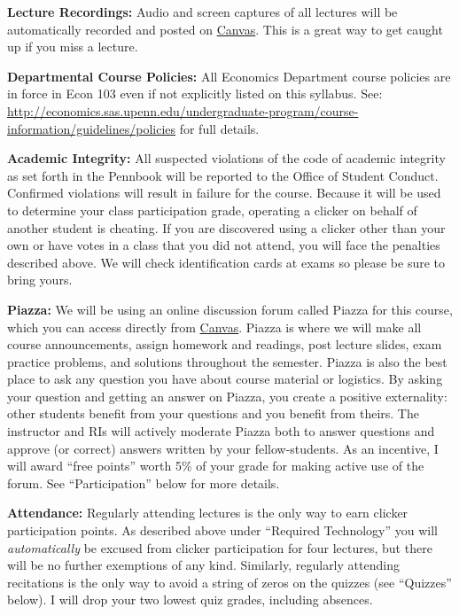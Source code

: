 \documentclass[11pt, letterpaper]{article}
\begin{document}
\bigskip

\noindent \textbf{Lecture Recordings: } Audio and screen captures of all lectures will be automatically recorded and posted on \href{http://upenn.instructure.com}{Canvas}. This is a great way to get caught up if you miss a lecture.

\bigskip

\noindent \textbf{Departmental Course Policies: } All Economics Department course policies are in force in Econ 103 even if not explicitly listed on this syllabus. See: \url{http://economics.sas.upenn.edu/undergraduate-program/course-information/guidelines/policies} for full details. 


\bigskip


\noindent \textbf{Academic Integrity: } All suspected violations of the code of academic integrity as set forth in the Pennbook will be reported to the Office of Student Conduct. Confirmed violations will result in failure for the course. Because it will be used to determine your class participation grade, operating a clicker on behalf of another student is cheating. If you are discovered using a clicker other than your own or have votes in a class that you did not attend, you will face the penalties described above. We will check identification cards at exams so please be sure to bring yours.

\bigskip

\noindent \textbf{Piazza:} We will be using an online discussion forum called Piazza for this course, which you can access directly from \href{http://upenn.instructure.com}{Canvas}. Piazza is where we will make all course announcements, assign homework and readings, post lecture slides, exam practice problems, and solutions throughout the semester. Piazza is also the best place to ask any question you have about course material or logistics. By asking your question and getting an answer on Piazza, you create a positive externality: other students benefit from your questions and you benefit from theirs. The instructor and RIs will actively moderate Piazza both to answer questions and approve (or correct) answers written by your fellow-students.  As an incentive, I will award ``free points'' worth 5\% of your grade for making active use of the forum. See ``Participation'' below for more details.

\bigskip

\noindent \textbf{Attendance:} Regularly attending lectures is the only way to earn clicker participation points. As described above under ``Required Technology'' you will \emph{automatically} be excused from clicker participation for four lectures, but there will be no further exemptions of any kind. Similarly, regularly attending recitations is the only way to avoid a string of zeros on the quizzes (see ``Quizzes'' below). I will drop your two lowest quiz grades, including absences.
\end{document}
